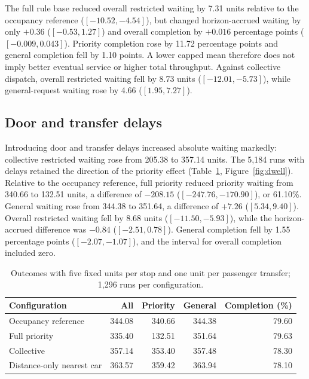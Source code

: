 The full rule base reduced overall restricted waiting by 7.31 units relative to the occupancy reference ($[-10.52,-4.54]$), but changed horizon-accrued waiting by only $+0.36$ ($[-0.53,1.27]$) and overall completion by $+0.016$ percentage points ($[-0.009,0.043]$). Priority completion rose by 11.72 percentage points and general completion fell by 1.10 points. A lower capped mean therefore does not imply better eventual service or higher total throughput. Against collective dispatch, overall restricted waiting fell by 8.73 units ($[-12.01,-5.73]$), while general-request waiting rose by 4.66 ($[1.95,7.27]$).

\subsection{Door and transfer delays}\label{sec:dwell}

Introducing door and transfer delays increased absolute waiting markedly: collective restricted waiting rose from 205.38 to 357.14 units. The 5,184 runs with delays retained the direction of the priority effect (Table~\ref{tab:dwell}, Figure~\ref{fig:dwell}). Relative to the occupancy reference, full priority reduced priority waiting from 340.66 to 132.51 units, a difference of $-208.15$ ($[-247.76,-170.90]$), or 61.10\%. General waiting rose from 344.38 to 351.64, a difference of $+7.26$ ($[5.34,9.40]$). Overall restricted waiting fell by 8.68 units ($[-11.50,-5.93]$), while the horizon-accrued difference was $-0.84$ ($[-2.51,0.78]$). General completion fell by 1.55 percentage points ($[-2.07,-1.07]$), and the interval for overall completion included zero.

\begin{table}[H]\centering
\caption{Outcomes with five fixed units per stop and one unit per passenger transfer; 1,296 runs per configuration.}\label{tab:dwell}
\small\begin{tabular}{@{}p{.30\linewidth}rrrr@{}}
\toprule Configuration & All & Priority & General & Completion (\%)\\\midrule
Occupancy reference & 344.08 & 340.66 & 344.38 & 79.60\\
Full priority & 335.40 & 132.51 & 351.64 & 79.63\\
Collective & 357.14 & 353.40 & 357.48 & 78.30\\
Distance-only nearest car & 363.57 & 359.42 & 363.94 & 78.10\\
\bottomrule
\end{tabular}
\end{table}

